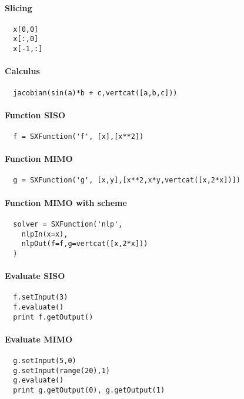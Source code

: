 \documentclass[a4paper,8pt]{article}
\begin{document}
\begin{multicols}{2}
\paragraph{Slicing}
\begin{verbatim}
  x[0,0]
  x[:,0]
  x[-1,:]
\end{verbatim}

\paragraph{Calculus}
\begin{verbatim}
  jacobian(sin(a)*b + c,vertcat([a,b,c]))
\end{verbatim}

\paragraph{Function SISO}

\begin{verbatim}
  f = SXFunction('f', [x],[x**2])
\end{verbatim}

\paragraph{Function MIMO}
\begin{verbatim}
  g = SXFunction('g', [x,y],[x**2,x*y,vertcat([x,2*x])])
\end{verbatim}

\paragraph{Function MIMO with scheme}
\begin{verbatim}
  solver = SXFunction('nlp',
    nlpIn(x=x),
    nlpOut(f=f,g=vertcat([x,2*x]))
  )
\end{verbatim}

\paragraph{Evaluate SISO}

\begin{verbatim}
  f.setInput(3)
  f.evaluate()
  print f.getOutput()
\end{verbatim}

\paragraph{Evaluate MIMO}
\begin{verbatim}
  g.setInput(5,0)
  g.setInput(range(20),1)
  g.evaluate()
  print g.getOutput(0), g.getOutput(1)
\end{verbatim}


\end{multicols}
\end{document}
